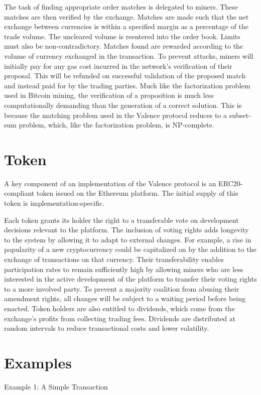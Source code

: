 \documentclass[a4paper]{article}
\begin{document}
	The task of finding appropriate order matches is delegated to
    miners. These matches are then verified by the exchange.
	Matches are made such that the net exchange between currencies is
    within a specified margin as a percentage of the trade volume.
    The uncleared volume is reentered into the order book.
    Limits must also be non-contradictory. Matches found
    are rewarded according to the volume of currency exchanged in
    the transaction.
    To prevent attacks, miners will initially pay
    for any gas cost incurred in the network's verification of
    their proposal. This will be refunded on successful
    validation of the proposed match and instead paid for by the
    trading parties. Much like the factorization problem used in Bitcoin
    mining, the verification of a proposition is much less
    computationally demanding than the generation of a correct solution.
    This is because the matching problem used in the Valence protocol
    reduces to a subset-sum problem, which, like the factorization
    problem, is NP-complete.
\section*{Token}
    A key component of an implementation of the Valence protocol is
    an ERC20-compliant token issued on the
    Ethereum platform. The initial supply of this token is
    implementation-specific.

		Each token grants its holder the right to a transferable vote on
    development decisions relevant to the platform.
	The inclusion of voting rights adds longevity to the system by
    allowing it to adapt to external changes. For example, a rise in
    popularity of a new cryptocurrency could be capitalized on by
    the addition to the exchange of transactions on that currency.
    Their transferability enables participation rates to remain
    sufficiently high by allowing miners who are less interested
    in the active development of the platform to transfer their
    voting rights to a more involved party. To prevent a majority coalition
    from abusing their amendment rights, all changes will be subject to a
    waiting period before being enacted.
		Token holders are also entitled to dividends, which come from the exchange's profits from collecting trading fees. Dividends are distributed at random intervals to reduce transactional costs and lower volatility.

\section*{Examples}
    	{Example 1: A Simple Transaction}
\end{document}
